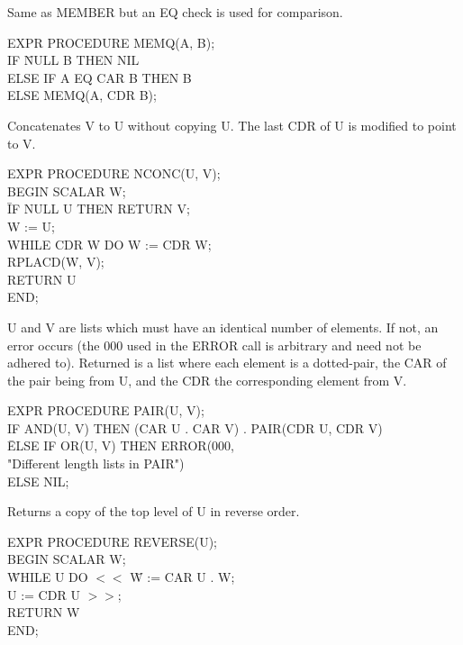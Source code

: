 {Same as MEMBER but an EQ check is used for comparison. 

{\tt \begin{tabbing} EXPR PROCEDURE MEMQ(A, B); \\
\hspace*{1em} IF \= NULL B THEN NIL \\
\> ELSE IF A EQ CAR B THEN B \\
\> ELSE MEMQ(A, CDR B);
\end{tabbing}}}

{Concatenates V to U without copying U. The last CDR of U is modified
to point to V.

{\tt \begin{tabbing} EXPR PROCEDURE NCONC(U, V); \\ BEGIN SCALAR W; \\
\hspace*{2em} \= IF NULL U THEN RETURN V; \\
\> W := U; \\
\> WHILE CDR W DO W := CDR W; \\
\> RPLACD(W, V); \\
\> RETURN U \\
END;
\end{tabbing}}}

{U and V are lists which must have an identical number of elements. If
not, an error occurs (the 000 used in the ERROR call is arbitrary and
need not be adhered to). Returned is a list where each element is a
dotted-pair, the CAR of the pair being from U, and the CDR the
corresponding element from V.

{\tt \begin{tabbing} EXPR PROCEDURE PAIR(U, V); \\
\hspace*{1em} IF AND(U, V) THEN (CAR U . CAR V) . PAIR(CDR U, CDR V) \\
\hspace*{2em} \= ELSE IF OR(U, V) THEN ERROR(000, \\
\hspace*{4em} "Different length lists in PAIR") \\
\> ELSE NIL;
\end{tabbing}}}


{Returns a copy of the top level of U in reverse order.

{\tt \begin{tabbing} EXPR PROCEDURE REVERSE(U); \\ BEGIN SCALAR W; \\
\hspace*{2em} \= WHILE U DO $<<$ \= W := CAR U . W; \\
\> \> U := CDR U $>>$; \\
\>  RETURN W \\
END;
\end{tabbing}}}

